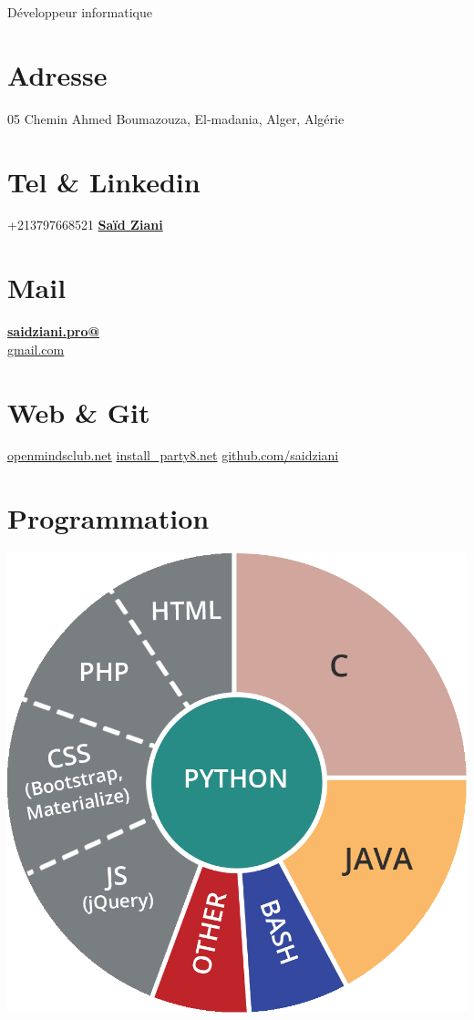 \documentclass[]{friggeri-cv}
\begin{document}
      {Développeur informatique}
      

\begin{aside}
  \section{Adresse}
    05 Chemin Ahmed Boumazouza,
    El-madania, Alger, Algérie
    ~
  \section{Tel \& Linkedin}
    +213797668521
    \href{https://www.linkedin.com/in/sa%C3%AFd-ziani-008487120/}{\textbf{Saïd Ziani}}
    ~
  \section{Mail}
    \href{mailto:saidziani.pro@gmail.com}{\textbf{saidziani.pro@}\\gmail.com}
    ~
  \section{Web \& Git}
    \href{http://www.openmindsclub.net}{openmindsclub.net}
    \href{http://www.openmindsclub.net/ip8}{install\_party8.net}
    \href{https://github.com/saidziani}{github.com/saidziani}
    ~
  \section{Programmation}
    \includegraphics[scale=0.1]{img/programmation.png}
    ~

\end{aside}
\end{document}
